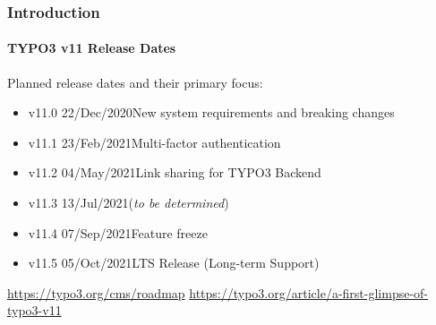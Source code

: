 %

\begin{frame}[fragile]
	\frametitle{Introduction}
	\framesubtitle{TYPO3 v11 Release Dates}

	Planned release dates and their primary focus:

	\begin{itemize}
		\item
			\begingroup
				\color{typo3orange}
				v11.0 \tabto{1.1cm}22/Dec/2020\tabto{3.4cm}New system requirements and breaking changes
			\endgroup
		\item v11.1 \tabto{1.1cm}23/Feb/2021\tabto{3.4cm}Multi-factor authentication
		\item v11.2 \tabto{1.1cm}04/May/2021\tabto{3.4cm}Link sharing for TYPO3 Backend
		\item v11.3 \tabto{1.1cm}13/Jul/2021\tabto{3.4cm}(\textit{to be determined})
		\item v11.4 \tabto{1.1cm}07/Sep/2021\tabto{3.4cm}Feature freeze
		\item v11.5 \tabto{1.1cm}05/Oct/2021\tabto{3.4cm}LTS Release (Long-term Support)

	\end{itemize}

	\smaller
		\url{https://typo3.org/cms/roadmap}\newline
		\url{https://typo3.org/article/a-first-glimpse-of-typo3-v11}
	\normalsize

\end{frame}

